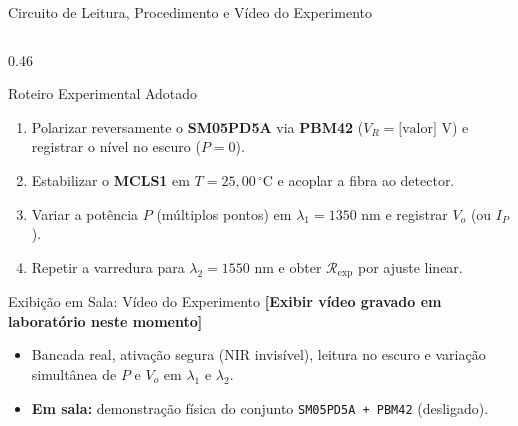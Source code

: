 \documentclass[aspectratio=169, 9pt]{beamer}
\begin{document}
\begin{frame}[shrink=2]{Circuito de Leitura, Procedimento e Vídeo do Experimento}
\begin{columns}[T, onlytextwidth]
    \begin{column}{0.46\textwidth}
      \begin{exampleblock}{Roteiro Experimental Adotado}
        \begin{enumerate}
          \item Polarizar reversamente o \textbf{SM05PD5A} via \textbf{PBM42} ($V_R = \text{[valor] V}$) e registrar o nível no escuro ($P=0$).
          \item Estabilizar o \textbf{MCLS1} em $T = 25{,}00\,^\circ\text{C}$ e acoplar a fibra ao detector.
          \item Variar a potência $P$ (múltiplos pontos) em $\lambda_1 = 1350\text{ nm}$ e registrar $V_o$ (ou $I_P$).
          \item Repetir a varredura para $\lambda_2 = 1550\text{ nm}$ e obter $\mathcal{R}_{\text{exp}}$ por ajuste linear.
        \end{enumerate}
      \end{exampleblock}
      \vspace{-0.1cm}
      \begin{alertblock}{Exibição em Sala: Vídeo do Experimento}
        \scriptsize
        \textbf{[Exibir vídeo gravado em laboratório neste momento]}
        \begin{itemize}
          \item Bancada real, ativação segura (NIR invisível), leitura no escuro e variação simultânea de $P$ e $V_o$ em $\lambda_1$ e $\lambda_2$.
          \item \textbf{Em sala:} demonstração física do conjunto \texttt{SM05PD5A + PBM42} (desligado).
        \end{itemize}
      \end{alertblock}
    \end{column}
  \end{columns}
\end{frame}
\end{document}
